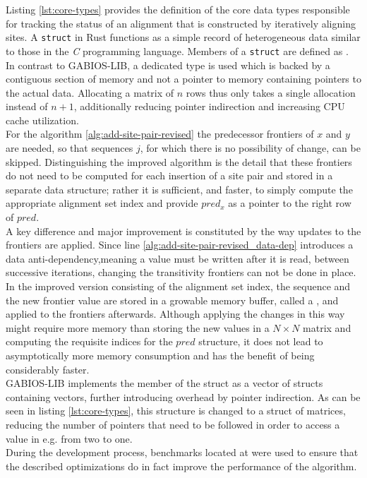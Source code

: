 Listing \ref{lst:core-types} provides the definition of the core data types responsible for tracking the status of an alignment that is constructed by iteratively aligning sites. A \texttt{struct} in Rust functions as a simple record of heterogeneous data similar to those in the \textit{C} programming language. Members of a \texttt{struct} are defined as .\\
In contrast to GABIOS-LIB, a dedicated  type is used which is backed by a contiguous section of memory and not a pointer to memory containing pointers to the actual data. Allocating a matrix of $n$ rows thus only takes a single allocation instead of $n+1$, additionally reducing pointer indirection and increasing CPU cache utilization.\\
For the algorithm \ref{alg:add-site-pair-revised} the predecessor frontiers of $x$ and $y$ are needed, so that sequences $j$, for which there is no possibility of change, can be skipped. Distinguishing the improved algorithm is the detail that these frontiers do not need to be computed for each insertion of a site pair and stored in a separate data structure; rather it is sufficient, and faster, to simply compute the appropriate alignment set index and provide $pred_x$ as a pointer to the right row of $pred$.\\
A key difference and major improvement is constituted by the way updates to the frontiers are applied. Since line \ref{alg:add-site-pair-revised_data-dep} introduces a data anti-dependency,meaning a value must be written after it is read, between successive iterations, changing the transitivity frontiers can not be done in place. In the improved version  consisting of the alignment set index, the sequence and the new frontier value are stored in a growable memory buffer, called a , and applied to the frontiers afterwards. Although applying the changes in this way might require more memory than storing the new values in a $N\times N$ matrix and computing the requisite indices for the $pred$ structure, it does not lead to asymptotically more memory consumption and has the benefit of being considerably faster.\\
GABIOS-LIB implements the member  of the  struct as a vector of structs containing vectors, further introducing overhead by pointer indirection. As can be seen in listing \ref{lst:core-types}, this structure is changed to a struct of matrices, reducing the number of pointers that need to be followed in order to access a value in e.g.  from two to one.\\
During the development process, benchmarks located at  were used to ensure that the described optimizations do in fact improve the performance of the algorithm.